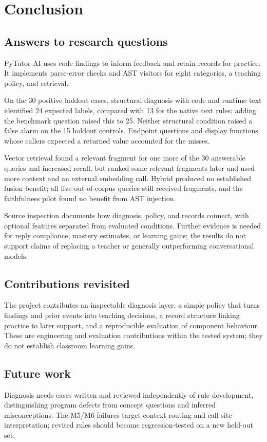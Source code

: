 \chapter{Conclusion}
\label{ch:conclusion}

\section{Answers to research questions}
PyTutor-AI uses code findings to inform feedback and retain records for practice. It implements parse-error checks and AST visitors for eight categories, a teaching policy, and retrieval.

On the 30 positive holdout cases, structural diagnosis with code and runtime text identified 24 expected labels, compared with 13 for the native text rules; adding the benchmark question raised this to 25. Neither structural condition raised a false alarm on the 15 holdout controls. Endpoint questions and display functions whose callers expected a returned value accounted for the misses.

Vector retrieval found a relevant fragment for one more of the 30 answerable queries and increased recall, but ranked some relevant fragments later and used more context and an external embedding call. Hybrid produced no established fusion benefit; all five out-of-corpus queries still received fragments, and the faithfulness pilot found no benefit from AST injection.

Source inspection documents how diagnosis, policy, and records connect, with optional features separated from evaluated conditions. Further evidence is needed for reply compliance, mastery estimates, or learning gains; the results do not support claims of replacing a teacher or generally outperforming conversational models.

\section{Contributions revisited}
The project contributes an inspectable diagnosis layer, a simple policy that turns findings and prior events into teaching decisions, a record structure linking practice to later support, and a reproducible evaluation of component behaviour. These are engineering and evaluation contributions within the tested system; they do not establish classroom learning gains.

\section{Future work}
Diagnosis needs cases written and reviewed independently of rule development, distinguishing program defects from concept questions and inferred misconceptions. The M5/M6 failures target context routing and call-site interpretation; revised rules should become regression-tested on a new held-out set.

